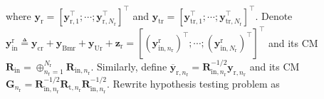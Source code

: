 \documentclass[10pt,journal]{IEEEtran}
\newcommand{\paren}[1]{\left({#1}\right)}
\newcommand{\bracket}[1]{{\left [{#1}\right ]}}
\newcommand{\rr}{_\mathrm{r}}
\newcommand{\sfrac}[2]{#1/#2}
\theoremstyle{definition}
\begin{document}

where $\mathbf{y}_{\mathrm{r}}=\bracket{\mathbf{y}^\top_{\textrm{r},1};\cdots;\mathbf{y}^\top_{\textrm{r},\mathit{N}\rr}}^\top$ and $\mathbf{y}_{\textrm{tr}}=\bracket{\mathbf{y}^\top_{\textrm{tr},1};\cdots;\mathbf{y}^\top_{\textrm{tr},\mathit{N}\rr}}^\top$. Denote $\mathbf{y}^\textrm{r}_{\textrm{in}}\triangleq\mathbf{y}_{\textrm{cr}}+\mathbf{y}_{\textrm{Bmr}}+\mathbf{y}_{\textrm{Ur}}+\mathbf{z}_{\textrm{r}}=\bracket{\paren{\mathbf{y}^{\textrm{r}}_{\textrm{in},n\rr}}^\top;\cdots;\paren{\mathbf{y}^{\textrm{r}}_{\textrm{in},\mathit{N}\rr}}^\top}^\top$ and its CM $\mathbf{R}_{\textrm{in}}=\oplus_{n\rr=1}^{N\rr}\mathbf{R}_{\textrm{in},n\rr}$. Similarly, define $\overline{\mathbf{y}}_{\textrm{r},n\rr} = \mathbf{R}^{-\sfrac{1}{2}}_{\textrm{in},n\rr}\mathbf{y}_{\textrm{r},n\rr}$ and its CM $\mathbf{G}_{n\rr}=\mathbf{R}^{-\sfrac{1}{2}}_{\textrm{in},n\rr}\mathbf{R}_{\textrm{t},n\rr}\mathbf{R}^{-\sfrac{1}{2}}_{\textrm{in},n\rr}$. Rewrite hypothesis testing problem as  \par\noindent\small
\end{document}
